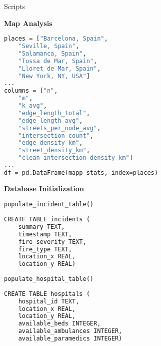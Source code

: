 \begin{frame}[fragile]{Scripts}
    \begin{minipage}[t]{0.48\textwidth}
        \centering
        \textbf{Map Analysis}

        \begin{lstlisting}[language=Python, breaklines=true]
places = ["Barcelona, Spain",
    "Seville, Spain",
    "Salamanca, Spain",
    "Tossa de Mar, Spain",
    "Lloret de Mar, Spain",
    "New York, NY, USA"]
...
columns = ["n",
    "m",
    "k_avg",
    "edge_length_total",
    "edge_length_avg",
    "streets_per_node_avg",
    "intersection_count",
    "edge_density_km",
    "street_density_km",
    "clean_intersection_density_km"]
...
df = pd.DataFrame(mapp_stats, index=places)
        \end{lstlisting}
    \end{minipage}
    \hfill
    \begin{minipage}[t]{0.48\textwidth}
        \centering
        \textbf{Database Initialization}
        \vspace{0.5em}

        \texttt{populate\_incident\_table()}
        \begin{lstlisting}[language=Python, breaklines=true]
CREATE TABLE incidents (
    summary TEXT,
    timestamp TEXT,
    fire_severity TEXT,
    fire_type TEXT,
    location_x REAL,
    location_y REAL)
        \end{lstlisting}
        \vspace{0.5em}
        \texttt{populate\_hospital\_table()}
        \begin{lstlisting}[language=Python, breaklines=true]
CREATE TABLE hospitals (
    hospital_id TEXT,
    location_x REAL,
    location_y REAL,
    available_beds INTEGER,
    available_ambulances INTEGER,
    available_paramedics INTEGER)
        \end{lstlisting}
    \end{minipage}
\end{frame}